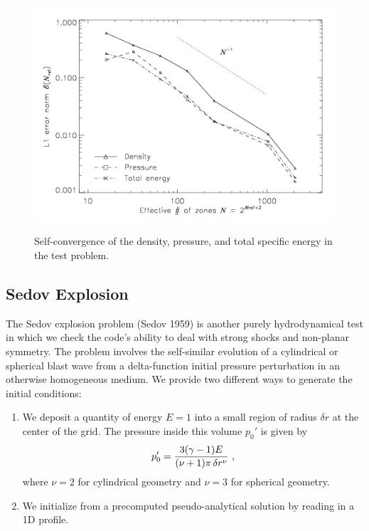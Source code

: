 \begin{figure}
\begin{center}
{\leavevmode\includegraphics[width=5in]{Blast2_conv}}
\end{center}
\caption{\label{Fig:WC convergence} Self-convergence of the density,
pressure, and total specific energy in the  test problem.
}
\end{figure}


\subsection{Sedov Explosion}
\label{Sec:SimulationSedov}

The Sedov explosion problem (Sedov 1959) is another purely hydrodynamical
test in which we check the code's ability to deal with strong shocks
and non-planar symmetry. The problem involves the self-similar evolution
of a cylindrical or
spherical blast wave from a delta-function initial pressure perturbation
in an otherwise homogeneous medium. 
We provide two different ways to generate the initial conditions:
\begin{enumerate}
\item
We deposit a quantity of energy $E=1$ into a
small region of radius $\delta r$ at the center of the grid.
The pressure inside this volume $p_0'$ is given by
\begin{equation}
p_0' = {3(\gamma-1)E\over(\nu+1)\pi\,\delta r^\nu}\ ,
\end{equation}
\noindent where $\nu=2$ for cylindrical geometry and $\nu=3$ for spherical
geometry. 
\item
We initialize from a precomputed pseudo-analytical solution by reading
in a 1D profile.
\end{enumerate}

